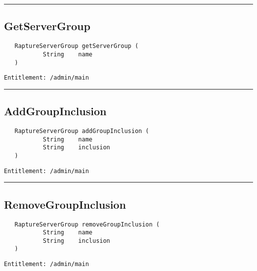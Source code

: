 \rule{12cm}{2pt}
\subsection{GetServerGroup}
\label{Api:GetServerGroup}
\begin{Verbatim}
   RaptureServerGroup getServerGroup (
           String    name
   )
\end{Verbatim}
\begin{Verbatim}[formatcom=\color{Maroon}]
  Entitlement: /admin/main
\end{Verbatim}



\rule{12cm}{2pt}
\subsection{AddGroupInclusion}
\label{Api:AddGroupInclusion}
\begin{Verbatim}
   RaptureServerGroup addGroupInclusion (
           String    name
           String    inclusion
   )
\end{Verbatim}
\begin{Verbatim}[formatcom=\color{Maroon}]
  Entitlement: /admin/main
\end{Verbatim}



\rule{12cm}{2pt}
\subsection{RemoveGroupInclusion}
\label{Api:RemoveGroupInclusion}
\begin{Verbatim}
   RaptureServerGroup removeGroupInclusion (
           String    name
           String    inclusion
   )
\end{Verbatim}
\begin{Verbatim}[formatcom=\color{Maroon}]
  Entitlement: /admin/main
\end{Verbatim}



